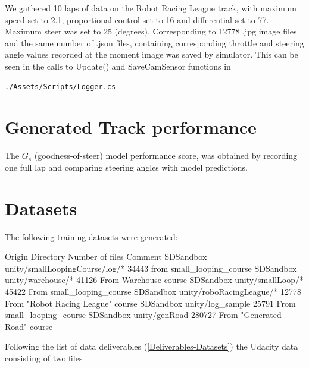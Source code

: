 We gathered 10 laps of data on the Robot Racing League track, with maximum speed set to 2.1, proportional control set to 16 and differential set to 77. Maximum steer was set to 25 (degrees). Corresponding to 12778 .jpg image files and the same number of  .json files, containing corresponding throttle and steering angle values recorded at the moment image was saved by simulator. This can be seen in the calls to Update() and SaveCamSensor functions in  
\begin{verbatim}
./Assets/Scripts/Logger.cs
\end{verbatim}

\section{Generated Track performance}


The $G_s$ (goodness-of-steer) model performance score, was obtained by recording one full lap and comparing steering angles with model predictions.

\section{Datasets}

The following training datasets were generated:

Origin  Directory   Number of files Comment
SDSandbox   unity/smallLoopingCourse/log/* 34443 from small\_looping\_course
SDSandbox   unity/warehouse/*   41126 From Warehouse course
SDSandbox   unity/smallLoop/*   45422   From small\_looping\_course
SDSandbox   unity/roboRacingLeague/* 12778 From "Robot Racing League" course
SDSandbox   unity/log\_sample   25791   From small\_looping\_course
SDSandbox   unity/genRoad 280727 From "Generated Road" course



Following the list of data deliverables (\ref{Deliverables-Datasets}) the Udacity data consisting of two files 

